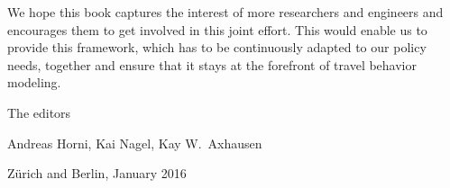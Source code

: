 

We hope this book captures the interest of more researchers and engineers and encourages them to get involved in this joint effort. This would enable us to provide this \gls{framework}, which has to be continuously adapted to our policy needs, together and ensure that it stays at the forefront of travel behavior modeling.

The editors

Andreas Horni, 	Kai Nagel,	Kay W.\ Axhausen


Zürich and Berlin, January 2016

%

